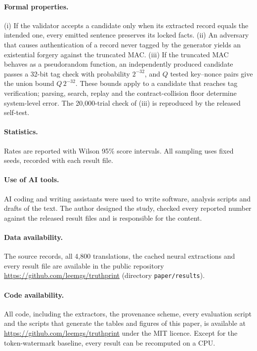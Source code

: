 \documentclass[12pt]{article}
\begin{document}
\paragraph{Formal properties.} (i) If the validator accepts a candidate only when its extracted record equals the intended one, every emitted sentence preserves its locked facts. (ii) An adversary that causes authentication of a record never tagged by the generator yields an existential forgery against the truncated MAC. (iii) If the truncated MAC behaves as a pseudorandom function, an independently produced candidate passes a 32-bit tag check with probability $2^{-32}$, and $Q$ tested key--nonce pairs give the union bound $Q\,2^{-32}$. These bounds apply to a candidate that reaches tag verification; parsing, search, replay and the contract-collision floor determine system-level error. The 20,000-trial check of (iii) is reproduced by the released self-test.

\paragraph{Statistics.} Rates are reported with Wilson 95\% score intervals\cite{wilson1927}. All sampling uses fixed seeds, recorded with each result file.

\paragraph{Use of AI tools.} AI coding and writing assistants were used to write software, analysis scripts and drafts of the text. The author designed the study, checked every reported number against the released result files and is responsible for the content.

\paragraph{Data availability.} The source records, all 4,800 translations, the cached neural extractions and every result file are available in the public repository \url{https://github.com/leemgs/truthprint} (directory \texttt{paper/results}).

\paragraph{Code availability.} All code, including the extractors, the provenance scheme, every evaluation script and the scripts that generate the tables and figures of this paper, is available at \url{https://github.com/leemgs/truthprint} under the MIT licence. Except for the token-watermark baseline, every result can be recomputed on a CPU.
\end{document}

